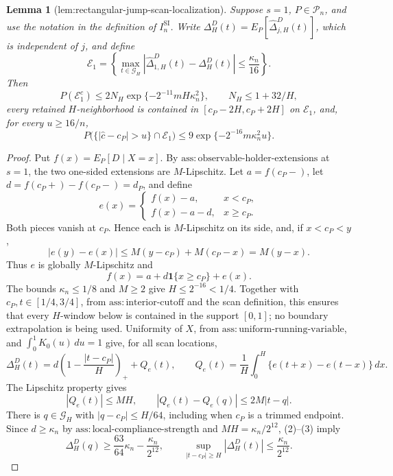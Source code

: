 \documentclass{article}
\newtheorem{lemma}{Lemma}
\begin{document}
\begin{lemma}[lem:rectangular-jump-scan-localization]\label{lem:rectangular-jump-scan-localization}
Suppose \(s=1\), \(P\in\mathcal P_n\), and use the notation in the
definition of \(I_n^{\mathrm{SI}}\).  Write
\(\Delta_H^D(t)=E_P[\widehat\Delta_{j,H}^D(t)]\), which is independent
of \(j\), and define
\[
 \mathcal E_1=\left\{
 \max_{t\in\mathcal G_H}
 \left|\widehat\Delta_{1,H}^{D}(t)-\Delta_H^D(t)\right|
 \le\frac{\kappa_n}{16}\right\}.
\]
Then
\[
 P(\mathcal E_1^c)
 \le2N_H\exp\{-2^{-11}mH\kappa_n^2\},
 \qquad N_H\le1+32/H,
\]
every retained \(H\)-neighborhood is contained in
\([c_P-2H,c_P+2H]\) on \(\mathcal E_1\), and, for every
\(u\ge16/n\),
\[
 P\bigl(\{|\widehat c-c_P|>u\}\cap\mathcal E_1\bigr)
 \le9\exp\{-2^{-16}m\kappa_n^2u\}.
\]
\end{lemma}
\begin{proof}
Put \(f(x)=E_P[D\mid X=x]\).  By
\(\mathrm{ass:observable\mbox{-}holder\mbox{-}extensions}\) at
\(s=1\), the two one-sided extensions are \(M\)-Lipschitz.  Let
\(a=f(c_P-)\), let \(d=f(c_P+)-f(c_P-)=d_P\), and define
\[
 e(x)=\begin{cases}
 f(x)-a,&x<c_P,\\
 f(x)-a-d,&x\ge c_P.
 \end{cases}
\]
Both pieces vanish at \(c_P\).  Hence each is \(M\)-Lipschitz on its
side, and, if \(x<c_P<y\),
\[
 |e(y)-e(x)|\le M(y-c_P)+M(c_P-x)=M(y-x).
\]
Thus \(e\) is globally \(M\)-Lipschitz and
\[
 f(x)=a+d\mathbf 1\{x\ge c_P\}+e(x). \tag{1}
\]
The bounds \(\kappa_n\le1/8\) and \(M\ge2\) give
\(H\le2^{-16}<1/4\).  Together with
\(c_P,t\in[1/4,3/4]\), from
\(\mathrm{ass:interior\mbox{-}cutoff}\) and the scan definition, this
ensures that every \(H\)-window below is contained in the support
\([0,1]\); no boundary extrapolation is being used.
Uniformity of \(X\), from
\(\mathrm{ass:uniform\mbox{-}running\mbox{-}variable}\), and
\(\int_0^1K_0(u)\,du=1\) give, for all scan locations,
\[
 \Delta_H^D(t)=d\left(1-\frac{|t-c_P|}{H}\right)_++Q_e(t),
 \qquad
 Q_e(t)=\frac1H\int_0^H\{e(t+x)-e(t-x)\}\,dx. \tag{2}
\]
The Lipschitz property gives
\[
 |Q_e(t)|\le MH,
 \qquad |Q_e(t)-Q_e(q)|\le2M|t-q|. \tag{3}
\]
There is \(q\in\mathcal G_H\) with \(|q-c_P|\le H/64\), including
when \(c_P\) is a trimmed endpoint.  Since \(d\ge\kappa_n\) by
\(\mathrm{ass:local\mbox{-}compliance\mbox{-}strength}\) and
\(MH=\kappa_n/2^{12}\), (2)--(3) imply
\[
 \Delta_H^D(q)\ge\frac{63}{64}\kappa_n-\frac{\kappa_n}{2^{12}},
 \qquad
 \sup_{|t-c_P|\ge H}|\Delta_H^D(t)|
 \le\frac{\kappa_n}{2^{12}}. \tag{4}
\]


\end{proof}
\end{document}
